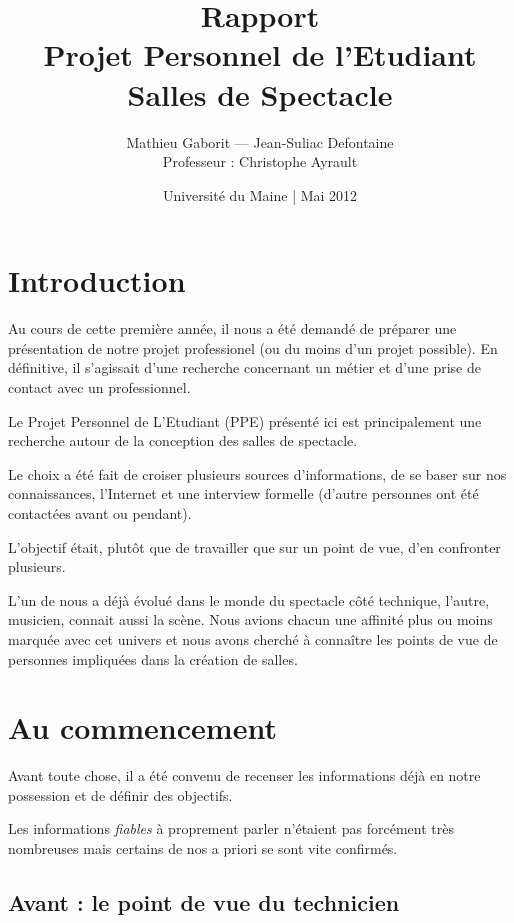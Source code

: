 \documentclass[a4paper, 11pt]{report}
\title{{\Huge Rapport}\\Projet Personnel de l'Etudiant\\
        Salles de Spectacle}
\author{Mathieu Gaborit — Jean-Suliac Defontaine\\Professeur : Christophe Ayrault}
\date{Université du Maine | Mai 2012}
\begin{document}
    \selectfont

    \maketitle
    
    \tableofcontents
    \newpage


\section*{Introduction}

Au cours de cette première année, il nous a été demandé de préparer une présentation de notre projet professionel (ou du moins d'un projet possible).
En définitive, il s'agissait d'une recherche concernant un métier et d'une prise de contact avec un professionnel.

Le Projet Personnel de L'Etudiant (PPE) présenté ici est principalement une recherche autour de la conception des salles de spectacle.

Le choix a été fait de croiser plusieurs sources d'informations, de se baser sur nos connaissances, l'Internet et une interview formelle (d'autre personnes ont été contactées avant ou pendant).

L'objectif était, plutôt que de travailler que sur un point de vue, d'en confronter plusieurs.

L'un de nous a déjà évolué dans le monde du spectacle côté technique, l'autre, musicien, connait aussi la scène.
Nous avions chacun une affinité plus ou moins marquée avec cet univers et nous avons cherché à connaître les points de vue de personnes impliquées dans la création de salles.

\section{Au commencement}

Avant toute chose, il a été convenu de recenser les informations déjà en notre possession et de définir des objectifs.

Les informations {\em fiables} à proprement parler n'étaient pas forcément très nombreuses mais certains de nos a priori se sont vite confirmés.

\subsection{Avant : le point de vue du technicien}
\end{document}

